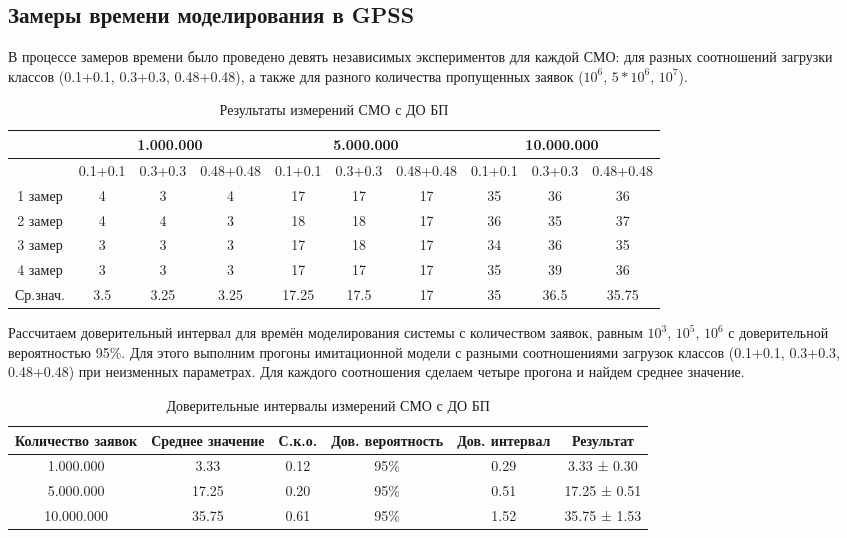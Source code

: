 \documentclass[a4paper,14pt]{report} %
\begin{document}
\subsection{Замеры времени моделирования в GPSS}
В процессе замеров времени было проведено девять независимых экспериментов для каждой СМО: для разных соотношений загрузки классов (0.1+0.1, 0.3+0.3, 0.48+0.48), а также для разного количества пропущенных заявок ($10^6$, $5*10^6$, $10^7$).

\begin{table}[h!]
\caption{Результаты измерений СМО с ДО БП}
\begin{tabular}{|c|c|c|c|c|c|c|c|c|c|}
\hline
 & \multicolumn{3}{|c|}{1.000.000} & \multicolumn{3}{|c|}{5.000.000} & \multicolumn{3}{|c|}{10.000.000} \\
\hline
 & 0.1+0.1 & 0.3+0.3 & 0.48+0.48 & 0.1+0.1 & 0.3+0.3 & 0.48+0.48 & 0.1+0.1 & 0.3+0.3 & 0.48+0.48 \\
\hline
1 замер & 4 & 3 & 4 & 17 & 17 & 17 & 35 & 36 & 36  \\
\hline
2 замер & 4 & 4 & 3 & 18 & 18 & 17 & 36 & 35 & 37 \\
\hline
3 замер & 3 & 3 & 3 & 17 & 18 & 17 & 34 & 36 & 35 \\
\hline
4 замер & 3 & 3 & 3 & 17 & 17 & 17 & 35 & 39 & 36 \\
\hline
Ср.знач. & 3.5 & 3.25 & 3.25 & 17.25 & 17.5 & 17 & 35 & 36.5 & 35.75 \\
\hline
\end{tabular}
\end{table} 

Рассчитаем доверительный интервал для времён моделирования системы с количеством заявок, равным $10^3$, $10^5$, $10^6$ с доверительной вероятностью 95\%. Для этого выполним прогоны имитационной модели с разными соотношениями загрузок классов (0.1+0.1, 0.3+0.3, 0.48+0.48) при неизменных параметрах. Для каждого соотношения сделаем четыре прогона и найдем среднее значение.

\begin{table}[h!]
\caption{Доверительные интервалы измерений СМО с ДО БП}
\begin{tabular}{|c|c|c|c|c|c|}
\hline
 Количество заявок & Среднее значение & С.к.о. & Дов. вероятность & Дов. интервал & Результат\\
\hline
1.000.000 & 3.33 & 0.12 & 95\% & 0.29 & 3.33 ± 0.30 \\
\hline
5.000.000 & 17.25 & 0.20 & 95\% & 0.51 & 17.25 ± 0.51 \\
\hline
10.000.000 & 35.75 & 0.61 & 95\% &1.52 & 35.75 ± 1.53 \\
\hline
\end{tabular}
\end{table} 
\end{document}
